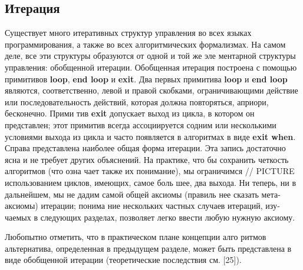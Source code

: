\documentclass{mai_book}
\begin{document}
\subsection{Итерация}
Существует много итеративных структур управления во всех языках 
программирования, а также во всех алгоритмических формализмах. 
На самом деле, все эти структуры образуются от одной и той же эле­
ментарной структуры управления: обобщенной итерации. Обобщенная 
итерация построена с помощью примитивов \textbf{loop},  \textbf{end loop} и \textbf{exit}. Два 
первых примитива \textbf{loop} и \textbf{end loop}  являются, соответственно, левой и 
правой скобками, ограничивающими действие или последовательность 
действий, которая должна повторяться, априори, бесконечно. Прими­
тив \textbf{exit} допускает выход из цикла, в котором он представлен; этот 
примитив  всегда  ассоциируется содним  или  несколькими  условиями 
выхода из цикла и часто появляется в алгоритмах в виде \textbf{exit when}.
Справа представлена наиболее общая форма 
итерации. Эта запись достаточно ясна и не 
требует других объяснений.  На практике, что­
бы сохранить четкость алгоритмов (что озна­
чает также их понимание), мы ограничимся                  // PICTURE
использованием  циклов,  имеющих,  самое  боль­
шее,  два  выхода.  Ни  теперь,  ни  в  дальнейшем, 
мы  не  дадим  самой  общей  аксиомы  (правиль­
нее  сказать  мета-аксиомы)  итерации;  понима­
ние нескольких частных случаев итераций, изу­
чаемых в следующих разделах,  позволяет легко 
ввести  любую  нужную  аксиому.

\parindent=1cm Любопытно отметить,  что  в  практическом  плане  концепции  алго­
ритмов альтернатива, определенная в предыдущем разделе, может быть 
представлена в виде обобщенной итерации  (теоретические  последствия 
см.  [25]).
\end{document}
